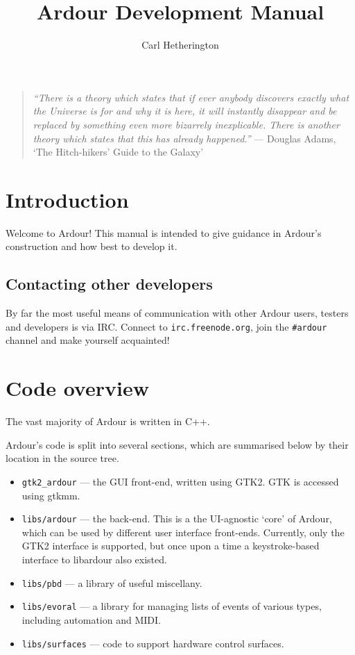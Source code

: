 \documentclass[10pt,a4paper]{book}
\title{Ardour Development Manual}
\author{Carl Hetherington}
\newcommand{\code}[1]{\texttt{#1}}
\begin{document}
\maketitle

\clearpage
\thispagestyle{empty}

\bigskip
\bigskip
\bigskip

\begin{quote}
\emph{``There is a theory which states that if ever anybody discovers exactly what the Universe is for and why it is here, it will instantly disappear and be replaced by something even more bizarrely inexplicable. There is another theory which states that this has already happened.''} --- Douglas Adams, `The Hitch-hikers' Guide to the Galaxy'
\end{quote}

\chapter{Introduction}

Welcome to Ardour!  This manual is intended to give guidance in
Ardour's construction and how best to develop it.

\section{Contacting other developers}

By far the most useful means of communication with other Ardour users,
testers and developers is via IRC.  Connect to
\texttt{irc.freenode.org}, join the \texttt{\#ardour} channel and make
yourself acquainted!

\chapter{Code overview}

The vast majority of Ardour is written in C++.  

Ardour's code is split into several sections, which are summarised
below by their location in the source tree.

\begin{itemize}
\item \code{gtk2\_ardour} --- the GUI front-end, written using GTK2.
  GTK is accessed using gtkmm.
\item \code{libs/ardour} --- the back-end.  This is a the UI-agnostic
  `core' of Ardour, which can be used by different user interface
  front-ends.  Currently, only the GTK2 interface is supported, but
  once upon a time a keystroke-based interface to libardour also
  existed.
\item \code{libs/pbd} --- a library of useful miscellany.
\item \code{libs/evoral} --- a library for managing lists of events of
  various types, including automation and MIDI\@.
\item \code{libs/surfaces} --- code to support hardware control
  surfaces.
\end{itemize}
\end{document}
